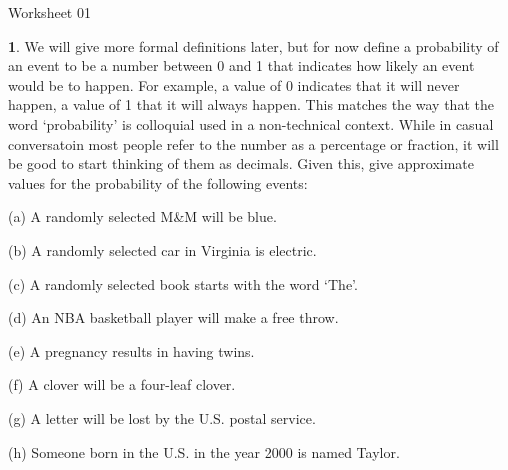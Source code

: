 \documentclass{tufte-handout}
\providecommand{\tightlist}{%
  \setlength{\itemsep}{0pt}\setlength{\parskip}{0pt}}
\begin{document}
\justify

{\LARGE Worksheet 01}

\vspace*{18pt}


\textbf{1}. We will give more formal definitions later, but for now
define a probability of an event to be a number between 0 and 1 that
indicates how likely an event would be to happen. For example, a
value of 0 indicates that it will never happen, a value of 1 that it
will always happen. This matches the way that the word `probability' is
colloquial used in a non-technical context. While in casual conversatoin
most people refer to the number as a percentage or fraction, it will
be good to start thinking of them as decimals. Given this, give approximate
values for the probability of the following events:

\begin{itemize}[\label={}]
  \tightlist
  \item {(a)} A randomly selected M\&M will be blue.
  \item {(b)} A randomly selected car in Virginia is electric.
  \item {(c)} A randomly selected book starts with the word `The'.
  \item {(d)} An NBA basketball player will make a free throw.
  \item {(e)} A pregnancy results in having twins.
  \item {(f)} A clover will be a four-leaf clover.
  \item {(g)} A letter will be lost by the U.S. postal service.
  \item {(h)} Someone born in the U.S. in the year 2000 is named Taylor.
\end{itemize}
\end{document}
